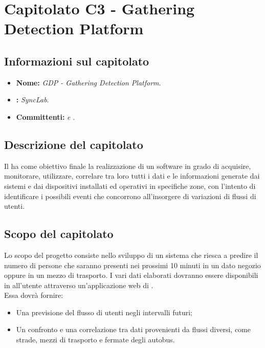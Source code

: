 \section{Capitolato C3 - Gathering Detection Platform}\label{C3}
\subsection{Informazioni sul capitolato}
\begin{itemize}
	\item \textbf{Nome:} \textit{GDP - Gathering Detection Platform}.
	\item \textbf{:} \textit{SyncLab}.
	\item \textbf{Committenti:} \textit{\VT{} e \CR{}}.
\end{itemize}

\subsection{Descrizione del capitolato}
Il  ha come obiettivo finale la realizzazione di un  software in grado di acquisire, monitorare, utilizzare, correlare tra loro tutti i dati e le informazioni generate dai sistemi e dai dispositivi installati ed operativi in specifiche zone, con l’intento di identificare i possibili eventi che concorrono all’insorgere di variazioni di flussi di utenti.

\subsection{Scopo del capitolato}
Lo scopo del progetto consiste nello sviluppo di un sistema che riesca a predire il numero di persone che saranno presenti nei prossimi 10 minuti in un dato negozio oppure in un mezzo di trasporto. I vari dati elaborati dovranno essere disponibili in  all'utente attraverso un'applicazione web di . \\
Essa dovrà fornire:
\begin{itemize}
	\item Una previsione del flusso di utenti negli intervalli futuri;
	\item Un confronto e una correlazione tra dati provenienti da flussi diversi, come strade, mezzi di trasporto e fermate degli autobus.
\end{itemize}

